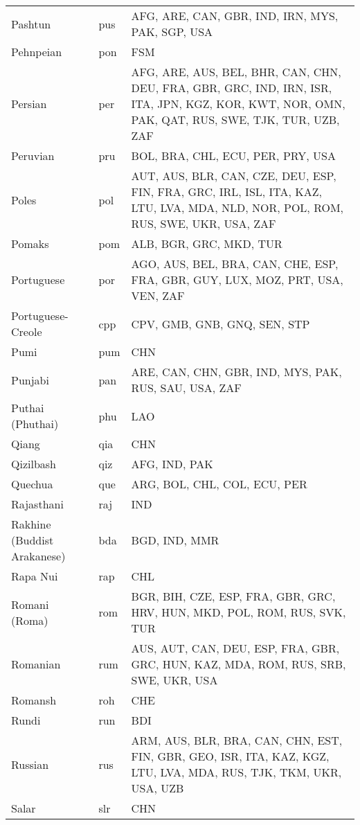 \documentclass[12pt]{article}
\begin{document}
\begin{center}
\begin{longtable}{|p{7cm}|p{1cm}|p{7cm}|}
Pashtun	&	pus 	&	AFG, ARE, CAN, GBR, IND, IRN, MYS, PAK, SGP, USA	\\	\cline{1-3}
Pehnpeian	&	pon 	&	FSM	\\	\cline{1-3}
Persian	&	per	&	AFG, ARE, AUS, BEL, BHR, CAN, CHN, DEU, FRA, GBR, GRC, IND, IRN, ISR, ITA, JPN, KGZ, KOR, KWT, NOR, OMN, PAK, QAT, RUS, SWE, TJK, TUR, UZB, ZAF	\\	\cline{1-3}
Peruvian	&	pru	&	BOL, BRA, CHL, ECU, PER, PRY, USA	\\	\cline{1-3}
Poles	&	pol 	&	AUT, AUS, BLR, CAN, CZE, DEU, ESP, FIN, FRA, GRC, IRL, ISL, ITA, KAZ, LTU, LVA, MDA, NLD, NOR, POL, ROM, RUS, SWE, UKR, USA, ZAF	\\	\cline{1-3}
Pomaks	&	pom	&	ALB, BGR, GRC, MKD, TUR	\\	\cline{1-3}
Portuguese 	&	por 	&	AGO, AUS, BEL, BRA, CAN, CHE, ESP, FRA, GBR, GUY, LUX, MOZ, PRT, USA, VEN, ZAF	\\	 \cline{1-3}
Portuguese-Creole	&	cpp 	&	CPV, GMB, GNB, GNQ, SEN, STP	\\	\cline{1-3}
Pumi	&	pum	&	CHN	\\	\cline{1-3}
Punjabi	&	pan 	&	ARE, CAN, CHN, GBR, IND, MYS, PAK, RUS, SAU, USA, ZAF	\\	\cline{1-3}
Puthai (Phuthai)	&	phu	&	LAO	\\	\cline{1-3}
Qiang	&	qia	&	CHN	\\	\cline{1-3}
Qizilbash	&	qiz	&	AFG, IND, PAK	\\	\cline{1-3}
Quechua	&	que 	&	ARG, BOL, CHL, COL, ECU, PER	\\	\cline{1-3}
Rajasthani	&	raj 	&	IND	\\	\cline{1-3}
Rakhine (Buddist Arakanese)	&	bda	&	BGD, IND, MMR	\\	\cline{1-3}
Rapa Nui	&	rap 	&	CHL	\\	\cline{1-3}
Romani (Roma)	&	rom 	&	BGR, BIH, CZE, ESP, FRA, GBR, GRC, HRV, HUN, MKD, POL, ROM, RUS, SVK, TUR	\\	 \cline{1-3}
Romanian	&	rum	&	AUS, AUT, CAN, DEU, ESP, FRA, GBR, GRC, HUN, KAZ, MDA, ROM, RUS, SRB, SWE, UKR, USA	\\	 \cline{1-3}
Romansh	&	roh 	&	CHE	\\	\cline{1-3}
Rundi	&	run 	&	BDI	\\	\cline{1-3}
Russian	&	rus 	&	ARM, AUS, BLR, BRA, CAN, CHN, EST, FIN, GBR, GEO, ISR, ITA, KAZ, KGZ, LTU, LVA, MDA, RUS, TJK, TKM, UKR, USA, UZB	\\	\cline{1-3}
Salar	&	slr	&	CHN	\\	\cline{1-3}

\end{longtable}
\end{center}
\end{document}

